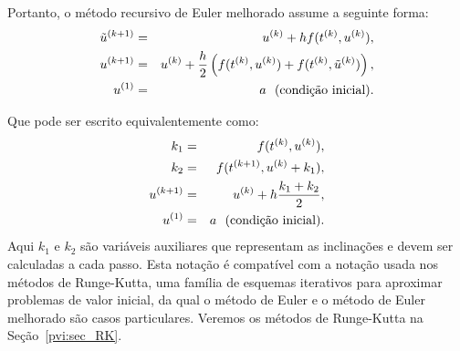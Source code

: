 Portanto, o método recursivo de Euler melhorado assume a seguinte forma:
\begin{eqnarray*}
\tilde{u}^{(k+1)}&=&u^{(k)}+h f(t^{(k)},u^{(k)}),\\
u^{(k+1)}&=&u^{(k)}+\frac{h}{2}\left(f(t^{(k)},u^{(k)})+f(t^{(k)},\tilde{u}^{(k)})\right),\\
u^{(1)}&=&a~~ \hbox{(condição inicial)}.
\end{eqnarray*}

Que pode ser escrito equivalentemente como:
\begin{eqnarray*}
k_1&=&f(t^{(k)},u^{(k)}),\\
k_2&=&f(t^{(k+1)},u^{(k)}+k_1),\\
u^{(k+1)}&=&u^{(k)}+h\frac{k_1+k_2}{2},\\
u^{(1)}&=&a~~ \hbox{(condição inicial)}.
\end{eqnarray*}
Aqui $k_1$ e $k_2$ são variáveis auxiliares que representam as inclinações e devem ser calculadas a cada passo. Esta notação é compatível com a notação usada nos métodos de Runge-Kutta, uma família de esquemas iterativos para aproximar problemas de valor inicial, da qual o método de Euler e o método de Euler melhorado são casos particulares. Veremos os métodos de Runge-Kutta na Seção~\ref{pvi:sec_RK}.


